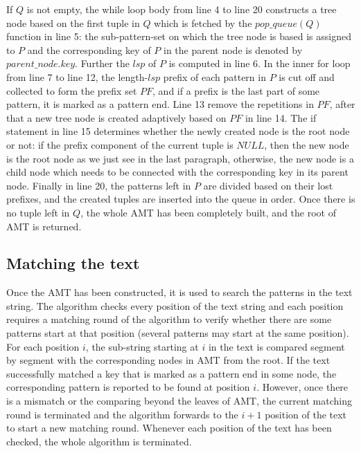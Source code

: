 \documentclass[legalpaper]{article}
\begin{document}
If $Q$ is not empty, the \textsf{while} loop body from line 4 to line
20 constructs a tree node based on the first tuple in $Q$ which is
fetched by the $pop\_queue(Q)$ function in line 5: the sub-pattern-set
on which the tree node is based is assigned to $P$ and the
corresponding key of $P$ in the parent node is denoted by
$parent\_node.key$.  Further the $lsp$ of $P$ is computed in line
6. In the inner \textsf{for} loop from line 7 to line 12, the
length-$lsp$ prefix of each pattern in $P$ is cut off and collected to
form the prefix set $PF$, and if a prefix is the last part of some
pattern, it is marked as a pattern end. Line 13 remove the repetitions
in $PF$, after that a new tree node is created adaptively based on
$PF$ in line 14. The \textsf{if} statement in line 15 determines
whether the newly created node is the root node or not: if the prefix
component of the current tuple is $NULL$, then the new node is the
root node as we just see in the last paragraph, otherwise, the new
node is a child node which needs to be connected with the
corresponding key in its parent node. Finally in line 20, the patterns
left in $P$ are divided based on their lost prefixes, and the created
tuples are inserted into the queue in order. Once there is no tuple
left in $Q$, the whole \textsf{AMT} has been completely built, and the
root of \textsf{AMT} is returned.

\subsection{Matching the text}
\label{sec:mp}
 
Once the \textsf{AMT} has been constructed, it is used to search the
patterns in the text string. The algorithm checks every position of
the text string and each position requires a \textsf{matching round}
of the algorithm to verify whether there are some patterns start at
that position (several patterns may start at the same position). For
each position $i$, the sub-string starting at $i$ in the text is
compared segment by segment with the corresponding nodes in
\textsf{AMT} from the root. If the text successfully matched a key
that is marked as a pattern end in some node, the corresponding
pattern is reported to be found at position $i$. However, once there
is a mismatch or the comparing beyond the leaves of \textsf{AMT}, the
current matching round is terminated and the algorithm forwards to the
$i+1$ position of the text to start a new matching round. Whenever
each position of the text has been checked, the whole algorithm is
terminated.
\end{document}
